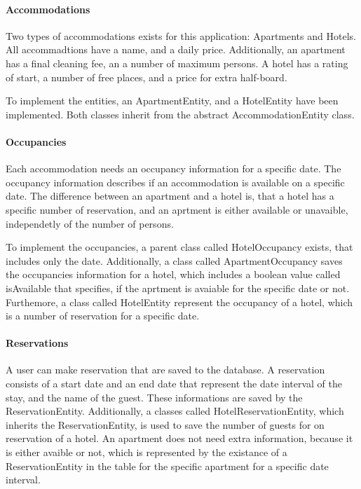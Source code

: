 \paragraph{Accommodations}
Two types of accommodations exists for this application: Apartments and Hotels. 
All accommadtions have a name, and a daily price. Additionally, an apartment has a final cleaning fee, an a number of maximum persons. A hotel has a rating of start, a number of free places, and a price for extra half-board.

To implement the entities, an ApartmentEntity, and a HotelEntity have been implemented. Both classes inherit from the abstract AccommodationEntity class.


\paragraph{Occupancies}
Each accommodation needs an occupancy information for a specific date. The occupancy information describes if an accommodation is available on a specific date. The difference between an apartment and a hotel is, that a hotel has a specific number of reservation, and an aprtment is either available or unavaible, independetly of the number of persons.

To implement the occupancies, a parent class called HotelOccupancy exists, that includes only the date. Additionally, a class called ApartmentOccupancy saves the occupancies information for a hotel, which includes a boolean value called isAvailable that specifies, if the aprtment is avaiable for the specific date or not. Furthemore, a class called HotelEntity represent the occupancy of a hotel, which is a number of reservation for a specific date.


\paragraph{Reservations}
A user can make reservation that are saved to the database. A reservation consists of a start date and an end date that represent the date interval of the stay, and the name of the guest. These informations are saved by the ReservationEntity. Additionally, a classes called HotelReservationEntity, which inherits the ReservationEntity, is used to save the number of guests for on reservation of a hotel. An apartment does not need extra information, because it is either avaible or not, which is represented by the existance of a ReservationEntity in the table for the specific apartment for a specific date interval.




